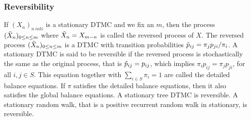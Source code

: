 \subsubsection*{Reversibility}
 If $(X_n)_{n\ in \mathbb{N}}$ is a stationary DTMC and we fix an $m$, then the process $(\Tilde{X}_n)_{0 \le n \le m}$ where $\Tilde{X}_n = X_{m-n}$ is called the reversed process of $X$.
 The reversed process $(\Tilde{X}_n)_{0 \le n \le m}$ is a DTMC with transition probabilities $\Tilde{p}_{ij} = \pi_j p_{ji}/\pi_i$.
 A stationary DTMC is said to be reversible if the reversed process is stochastically the same as the original process, that is $\Tilde{p}_{ij} = p_{ij}$, which implies $\pi_i p_{ij} = \pi_j p_{ji}$, for all $i,j \in S$. This equation together with $\sum_{i \in S} \pi_i = 1$ are called the detailed balance equations. 
 If $\pi$ satisfies the detailed balance equations, then it also satisfies the global balance equations.
 A stationary tree DTMC is reversible.
 A stationary random walk, that is a positive recurrent random walk in stationary, is reversible.
